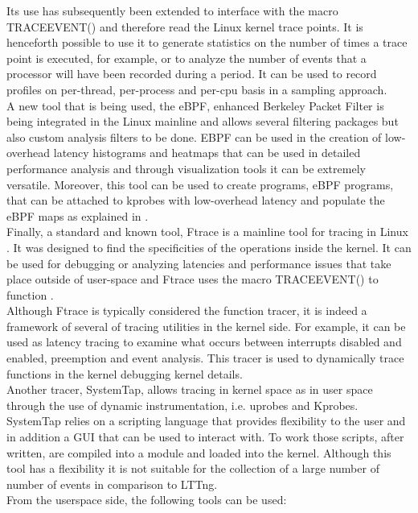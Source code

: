 Its use has subsequently been extended to interface with the macro TRACE\textunderscore EVENT() and therefore read the Linux kernel trace points. It is henceforth possible to use it to generate statistics on the number of times a trace point is executed, for example, or to analyze the number of events that a processor will have been recorded during a period. It can be used to record profiles on per-thread, per-process and per-cpu basis in a sampling approach.\\
A new tool that is being used, the eBPF, enhanced Berkeley Packet Filter \cite{ebpf} is being integrated in the Linux mainline and allows several filtering packages but also custom analysis filters to be done. EBPF can be used in the creation of low-overhead latency histograms and heatmaps that can be used in detailed performance analysis and through visualization tools it can be extremely versatile. Moreover, this tool can be used to create programs, eBPF programs, that can be attached to kprobes with low-overhead latency and populate the eBPF maps as explained in \cite{ebpf_maps}. \\
Finally, a standard and known tool, Ftrace is a mainline tool for tracing in Linux . It was designed to find the specificities of the operations inside the kernel. It can be used for debugging or analyzing latencies and performance issues that take place outside of user-space and Ftrace uses the macro TRACE\textunderscore EVENT() to function \cite{ftrace_red}.\\
Although Ftrace is typically considered the function tracer, it is indeed a framework of several of tracing utilities in the kernel side. For example, it can be used as latency tracing to examine what occurs between interrupts disabled and enabled, preemption and event analysis. This tracer is used to dynamically trace functions in the kernel debugging kernel details. \\
Another tracer, SystemTap, allows tracing in kernel space as in user space through the use of dynamic instrumentation, i.e. uprobes and Kprobes. SystemTap relies on  a scripting language that provides flexibility to the user and in addition a GUI that can be used to interact with.  To work those scripts, after written, are compiled into a module and loaded into the kernel. Although this tool has a flexibility it is not suitable for the collection of a large number of number of events in comparison to LTTng.\\
From the userspace side, the following tools can be used:\\
